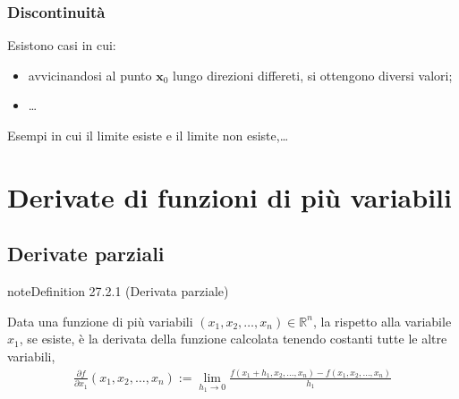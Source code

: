 \documentclass[letterpaper,10pt,italian]{jupyterBook}
\begin{document}
\subsubsection{Discontinuità}
\label{\detokenize{ch/multivariable-calculus/limits:discontinuita}}\label{\detokenize{ch/multivariable-calculus/limits:multivariable-calculus-discontinuity}}
\sphinxAtStartPar
Esistono casi in cui:
\begin{itemize}
\item {} 
\sphinxAtStartPar
avvicinandosi al punto \(\mathbf{x}_0\) lungo direzioni differeti, si ottengono diversi valori; 

\item {} 
\sphinxAtStartPar
…

\end{itemize}

\sphinxAtStartPar
{} Esempi in cui il limite esiste e il limite non esiste,…



\sphinxstepscope


\section{Derivate di funzioni di più variabili}
\label{\detokenize{ch/multivariable-calculus/derivatives:derivate-di-funzioni-di-piu-variabili}}\label{\detokenize{ch/multivariable-calculus/derivatives:multivariable-calculus-derivatives}}\label{\detokenize{ch/multivariable-calculus/derivatives::doc}}

\subsection{Derivate parziali}
\label{\detokenize{ch/multivariable-calculus/derivatives:derivate-parziali}}\label{\detokenize{ch/multivariable-calculus/derivatives:multivariable-calculus-derivatives-partial}}\label{ch/multivariable-calculus/derivatives:multivariable-calculus-partial-derivative}
\begin{sphinxadmonition}{note}{Definition 27.2.1 (Derivata parziale)}



\sphinxAtStartPar
Data una funzione di più variabili \((x_1, x_2, \dots, x_n) \in \mathbb{R}^n\), la  rispetto alla variabile \(x_1\), se esiste, è la derivata della funzione calcolata tenendo costanti tutte le altre variabili,
\begin{equation*}
\begin{split}\frac{\partial f}{\partial x_1}(x_1, x_2, \dots, x_n) := \lim_{h_1 \rightarrow 0} \frac{f(x_1+h_1, x_2, \dots, x_n) - f(x_1, x_2, \dots, x_n)}{h_1}\end{split}
\end{equation*}\end{sphinxadmonition}
\end{document}
